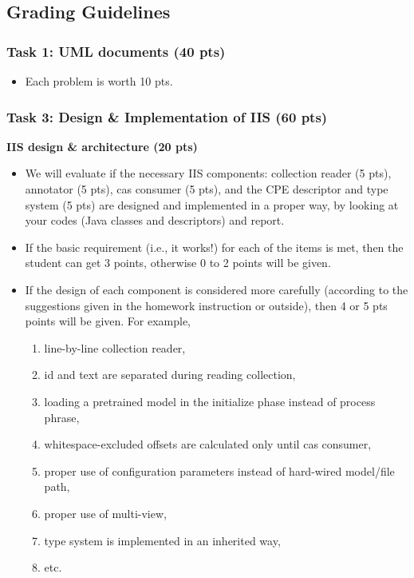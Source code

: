 
\subsection{Grading Guidelines}

\subsubsection{Task 1: UML documents (40 pts)}

\begin{itemize}

\item Each problem is worth 10 pts. \\
 
\end{itemize}

\subsubsection{Task 3: Design \& Implementation of IIS (60 pts)}

\textbf{IIS design \& architecture (20 pts)}
 
\begin{itemize}

\item We will evaluate if the necessary IIS components: collection reader (5
pts), annotator (5 pts), cas consumer (5 pts), and the CPE descriptor and type
system (5 pts) are designed and implemented in a proper way, by looking at your
codes (Java classes and descriptors) and report.

\item If the basic requirement (i.e., it works!) for each of the items is met,
then the student can get 3 points, otherwise 0 to 2 points will be given.

\item If the design of each component is considered more carefully (according to
the suggestions given in the homework instruction or outside), then 4 or 5 pts
points will be given. For example,

\begin{enumerate}
\item line-by-line collection reader,
\item id and text are separated during reading collection,
\item loading a pretrained model in the initialize phase instead of process phrase,
\item whitespace-excluded offsets are calculated only until cas consumer,
\item proper use of configuration parameters instead of hard-wired model/file path,
\item proper use of multi-view,
\item type system is implemented in an inherited way,
\item etc.
\end{enumerate}

\end{itemize}

